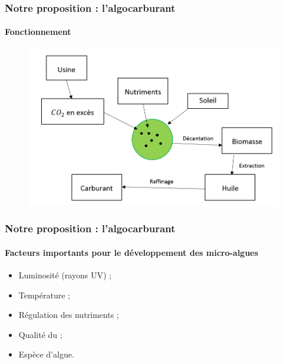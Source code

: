 \documentclass{beamer}
\begin{document}
	\begin{frame}
		\frametitle{Notre proposition : l'algocarburant}
		\framesubtitle{Fonctionnement}
		\begin{figure}
			\centering
			\includegraphics[scale=0.55]{media/fonctionnement.png}
		\end{figure}
	\end{frame}
	
	\begin{frame}
		\frametitle{Notre proposition : l'algocarburant}
		\framesubtitle{Facteurs importants pour le développement des micro-algues}
		\Large{\begin{itemize}
			\item Luminosité (rayons UV) \cite{Lexpansion} ;
			\item Température ;
			\item Régulation des nutriments \cite{BulletinsElec} ;
			\item Qualité du \chemform{CO_2} ;
			\item Espèce d'algue.
		\end{itemize}}
	\end{frame}
	
\end{document}

